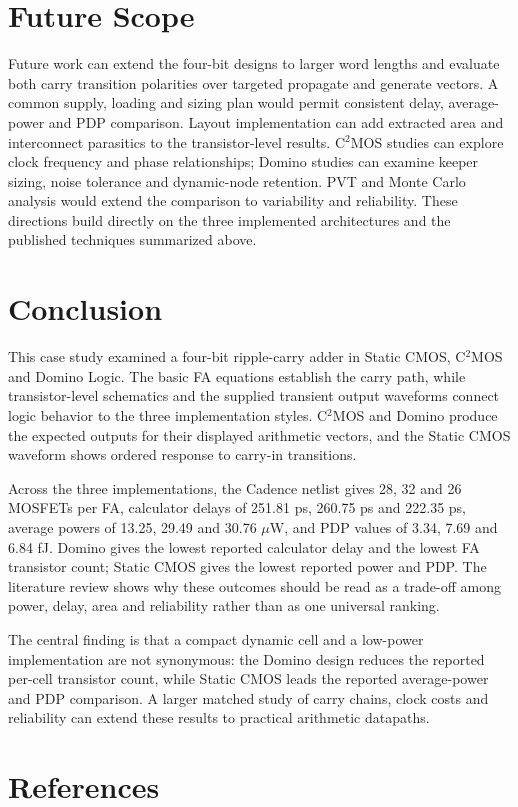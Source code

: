 \documentclass[11pt,a4paper]{article}
\begin{document}
\section{Future Scope}
Future work can extend the four-bit designs to larger word lengths and evaluate both carry transition polarities over targeted propagate and generate vectors. A common supply, loading and sizing plan would permit consistent delay, average-power and PDP comparison. Layout implementation can add extracted area and interconnect parasitics to the transistor-level results. C$^{2}$MOS studies can explore clock frequency and phase relationships; Domino studies can examine keeper sizing, noise tolerance and dynamic-node retention. PVT and Monte Carlo analysis would extend the comparison to variability and reliability. These directions build directly on the three implemented architectures and the published techniques summarized above.

\section{Conclusion}
This case study examined a four-bit ripple-carry adder in Static CMOS, C$^{2}$MOS and Domino Logic. The basic FA equations establish the carry path, while transistor-level schematics and the supplied transient output waveforms connect logic behavior to the three implementation styles. C$^{2}$MOS and Domino produce the expected outputs for their displayed arithmetic vectors, and the Static CMOS waveform shows ordered response to carry-in transitions.

Across the three implementations, the Cadence netlist gives 28, 32 and 26 MOSFETs per FA, calculator delays of 251.81 ps, 260.75 ps and 222.35 ps, average powers of 13.25, 29.49 and 30.76 $\mu$W, and PDP values of 3.34, 7.69 and 6.84 fJ. Domino gives the lowest reported calculator delay and the lowest FA transistor count; Static CMOS gives the lowest reported power and PDP. The literature review shows why these outcomes should be read as a trade-off among power, delay, area and reliability rather than as one universal ranking.

The central finding is that a compact dynamic cell and a low-power implementation are not synonymous: the Domino design reduces the reported per-cell transistor count, while Static CMOS leads the reported average-power and PDP comparison. A larger matched study of carry chains, clock costs and reliability can extend these results to practical arithmetic datapaths.

\section{References}
\renewcommand{\refname}{}


\end{document}
